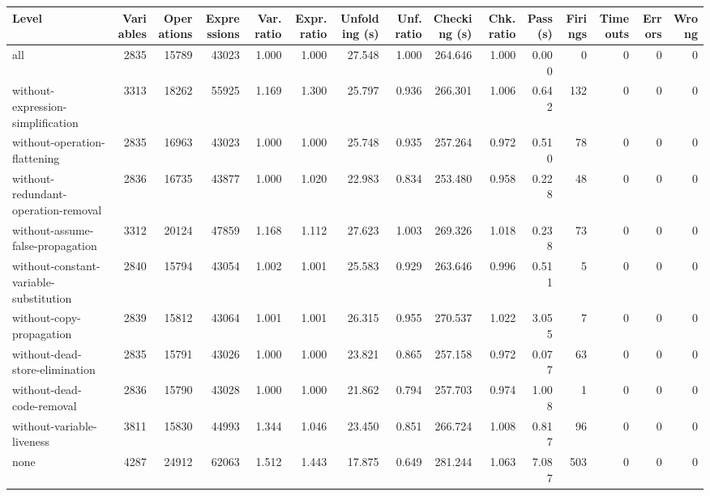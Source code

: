 \begin{tabular}{lrrrrrrrrrrrrrr}
\toprule
Level & Variables & Operations & Expressions & Var. ratio & Expr. ratio & Unfolding (s) & Unf. ratio & Checking (s) & Chk. ratio & Pass (s) & Firings & Timeouts & Errors & Wrong \\
\midrule
all & 2835 & 15789 & 43023 & 1.000 & 1.000 & 27.548 & 1.000 & 264.646 & 1.000 & 0.000 & 0 & 0 & 0 & 0 \\
without-expression-simplification & 3313 & 18262 & 55925 & 1.169 & 1.300 & 25.797 & 0.936 & 266.301 & 1.006 & 0.642 & 132 & 0 & 0 & 0 \\
without-operation-flattening & 2835 & 16963 & 43023 & 1.000 & 1.000 & 25.748 & 0.935 & 257.264 & 0.972 & 0.510 & 78 & 0 & 0 & 0 \\
without-redundant-operation-removal & 2836 & 16735 & 43877 & 1.000 & 1.020 & 22.983 & 0.834 & 253.480 & 0.958 & 0.228 & 48 & 0 & 0 & 0 \\
without-assume-false-propagation & 3312 & 20124 & 47859 & 1.168 & 1.112 & 27.623 & 1.003 & 269.326 & 1.018 & 0.238 & 73 & 0 & 0 & 0 \\
without-constant-variable-substitution & 2840 & 15794 & 43054 & 1.002 & 1.001 & 25.583 & 0.929 & 263.646 & 0.996 & 0.511 & 5 & 0 & 0 & 0 \\
without-copy-propagation & 2839 & 15812 & 43064 & 1.001 & 1.001 & 26.315 & 0.955 & 270.537 & 1.022 & 3.055 & 7 & 0 & 0 & 0 \\
without-dead-store-elimination & 2835 & 15791 & 43026 & 1.000 & 1.000 & 23.821 & 0.865 & 257.158 & 0.972 & 0.077 & 63 & 0 & 0 & 0 \\
without-dead-code-removal & 2836 & 15790 & 43028 & 1.000 & 1.000 & 21.862 & 0.794 & 257.703 & 0.974 & 1.008 & 1 & 0 & 0 & 0 \\
without-variable-liveness & 3811 & 15830 & 44993 & 1.344 & 1.046 & 23.450 & 0.851 & 266.724 & 1.008 & 0.817 & 96 & 0 & 0 & 0 \\
none & 4287 & 24912 & 62063 & 1.512 & 1.443 & 17.875 & 0.649 & 281.244 & 1.063 & 7.087 & 503 & 0 & 0 & 0 \\
\bottomrule
\end{tabular}
